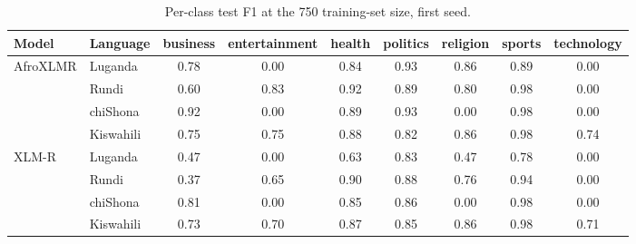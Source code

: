 \begin{table}[t]
\centering
\caption{Per-class test F1 at the 750 training-set size, first seed.}
\label{tab:per_class_f1}
\small
\begin{tabular}{llccccccc}
\toprule
Model & Language & business & entertainment & health & politics & religion & sports & technology \\
\midrule
AfroXLMR & Luganda & 0.78 & 0.00 & 0.84 & 0.93 & 0.86 & 0.89 & 0.00 \\
 & Rundi & 0.60 & 0.83 & 0.92 & 0.89 & 0.80 & 0.98 & 0.00 \\
 & chiShona & 0.92 & 0.00 & 0.89 & 0.93 & 0.00 & 0.98 & 0.00 \\
 & Kiswahili & 0.75 & 0.75 & 0.88 & 0.82 & 0.86 & 0.98 & 0.74 \\
\midrule
XLM-R & Luganda & 0.47 & 0.00 & 0.63 & 0.83 & 0.47 & 0.78 & 0.00 \\
 & Rundi & 0.37 & 0.65 & 0.90 & 0.88 & 0.76 & 0.94 & 0.00 \\
 & chiShona & 0.81 & 0.00 & 0.85 & 0.86 & 0.00 & 0.98 & 0.00 \\
 & Kiswahili & 0.73 & 0.70 & 0.87 & 0.85 & 0.86 & 0.98 & 0.71 \\
\bottomrule
\end{tabular}
\end{table}